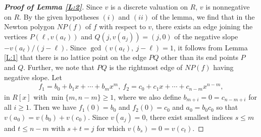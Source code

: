 \documentclass[12pt]{amsart}%
\begin{document}
\begin{proof}[\bf Proof of Lemma \ref{L:2}] Since $v$ is a discrete valuation on $R$, $v$ is nonnegative on $R$. By the given hypotheses $(i)$ and $(ii)$ of the lemma, we find that in the Newton polygon  $NP(f)$ of $f$ with respect to $v$, there exists an edge joining the vertices $P(\ell,v(a_\ell))$ and $Q(j,v(a_j))=(j,0)$ of the negative slope $-v(a_\ell)/(j-\ell)$. Since $\gcd(v(a_\ell),~j-\ell)=1$, it follows from Lemma \ref{L:1} that there is no lattice point on the edge $PQ$ other than its  end points $P$ and $Q$. Further, we note that $PQ$ is the rightmost edge of $NP(f)$ having negative slope. 
Let
\begin{eqnarray*}
f_1=b_0+b_1 x+\cdots+b_m x^m,~f_2=c_0+c_1 x+\cdots+c_{n-m} x^{n-m},
\end{eqnarray*}
in $R[x]$ with $\min\{m,n-m\}\geq 1$, where we also define $b_{m+i}=0=c_{n-m+i}$ for all $i\geq 1$.  Then we have $f_1(0)=b_0$ and $f_2(0)=c_0$ and $a_0=b_0c_0$ so that $v(a_0)=v(b_0)+v(c_0)$.  Since $v(a_j)=0$, there exist smallest indices $s\leq m$ and $t\leq n-m$ with $s+t=j$ for which $v(b_s)=0=v(c_t)$. 


\end{proof}
\end{document}
